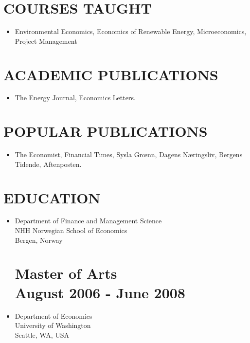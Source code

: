 \documentclass[margin]{res}
\begin{document}
\begin{resume}
\section{COURSES TAUGHT}
\begin{itemize}
\item[] Environmental Economics, Economics of Renewable Energy, Microeconomics, Project Management
\end{itemize}

\section{ACADEMIC PUBLICATIONS}
\begin{itemize}
\item[] The Energy Journal, Economics Letters. 
\end{itemize}

\section{POPULAR PUBLICATIONS}
\begin{itemize}
\item[] The Economist, Financial Times, Sysla Gr\oe nn, Dagens Næringsliv, Bergens Tidende, Aftenposten. 
\end{itemize}

\section{EDUCATION}      
 
\begin{itemize}
\normalsize{\section{Ph.D. Management Science \\ August 2008 - May 2012}} 
\item[] Department of Finance and Management Science\\
NHH Norwegian School of Economics \\
Bergen, Norway \\   

\normalsize{\section{\bf Master of Arts \\ August 2006 - June 2008}}
\item[] Department of Economics \\
University of Washington \\
Seattle, WA, USA \\


\end{itemize}
\end{resume}
\end{document}
